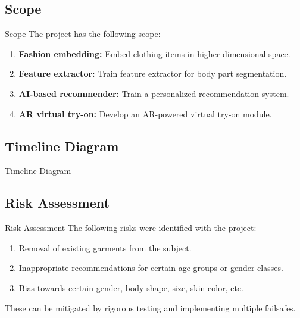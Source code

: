 \subsection{Scope}
\begin{frame}{Scope}
	The project has the following scope:
	\begin{enumerate}
		\item \textbf{Fashion embedding:} Embed clothing items in higher-dimensional space.
		\item \textbf{Feature extractor:} Train feature extractor for body part segmentation.
		\item \textbf{AI-based recommender:} Train a personalized recommendation system.
		\item \textbf{AR virtual try-on:} Develop an AR-powered virtual try-on module.
	\end{enumerate}
\end{frame}

\subsection{Timeline Diagram}
\begin{frame}{Timeline Diagram}
	
\end{frame}

\subsection{Risk Assessment}
\begin{frame}{Risk Assessment}
	The following risks were identified with the project:
	\begin{enumerate}
		\item Removal of existing garments from the subject.
		\item Inappropriate recommendations for certain age groups or gender classes.
		\item Bias towards certain gender, body shape, size, skin color, etc.
	\end{enumerate}
	These can be mitigated by rigorous testing and implementing multiple failsafes.
\end{frame}
